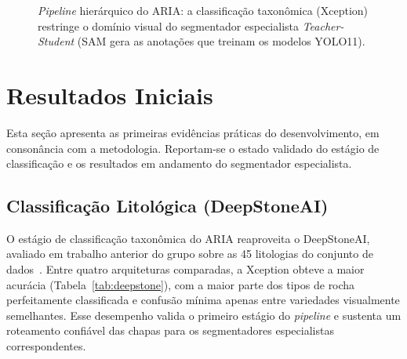 \documentclass[12pt]{article}
\begin{document}
\begin{figure}[ht]
  \centering
  \caption{\textit{Pipeline} hierárquico do ARIA: a classificação taxonômica
    (Xception) restringe o domínio visual do segmentador especialista
    \textit{Teacher-Student} (SAM gera as anotações que treinam os modelos
    YOLO11).}
  \label{fig:arquitetura}
\end{figure}

\section{Resultados Iniciais}
\label{sec:resultados}

Esta seção apresenta as primeiras evidências práticas do desenvolvimento, em consonância com a metodologia. Reportam-se o estado validado do estágio de classificação e os resultados em andamento do segmentador especialista.

\subsection{Classificação Litológica (DeepStoneAI)}

O estágio de classificação taxonômica do ARIA reaproveita o DeepStoneAI, avaliado em trabalho anterior do grupo sobre as 45 litologias do conjunto de dados~\cite{deepstoneai_moreira2025}. Entre quatro arquiteturas comparadas, a Xception obteve a maior acurácia (Tabela~\ref{tab:deepstone}), com a maior parte dos tipos de rocha perfeitamente classificada e confusão mínima apenas entre variedades visualmente semelhantes. Esse desempenho valida o primeiro estágio do \textit{pipeline} e sustenta um roteamento confiável das chapas para os segmentadores especialistas correspondentes.
\end{document}
